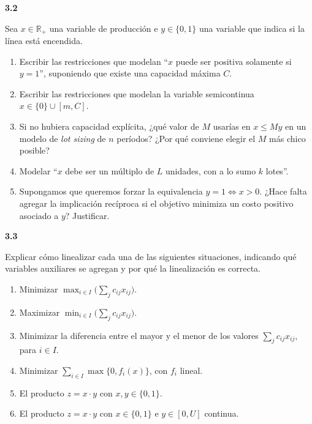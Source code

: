 \documentclass[11pt,a4paper]{article}
\newcommand{\ejercicio}[1]{\par\medskip\noindent\textbf{#1}\par\nopagebreak\smallskip}
\newcommand{\R}{\mathbb{R}}
\begin{document}
\ejercicio{3.2}
Sea $x \in \R_+$ una variable de producción e $y \in \{0,1\}$ una variable que
indica si la línea está encendida.
\begin{enumerate}
  \item Escribir las restricciones que modelan ``$x$ puede ser positiva
  solamente si $y = 1$'', suponiendo que existe una capacidad máxima $C$.
  \item Escribir las restricciones que modelan la variable semicontinua
  $x \in \{0\} \cup [m, C]$.
  \item Si no hubiera capacidad explícita, ¿qué valor de $M$ usarías en
  $x \le M y$ en un modelo de \emph{lot sizing} de $n$ períodos? ¿Por qué
  conviene elegir el $M$ más chico posible?
  \item Modelar ``$x$ debe ser un múltiplo de $L$ unidades, con a lo sumo $k$
  lotes''.
  \item Supongamos que queremos forzar la equivalencia $y = 1 \iff x > 0$.
  ¿Hace falta agregar la implicación recíproca si el objetivo minimiza un costo
  positivo asociado a $y$? Justificar.
\end{enumerate}

\ejercicio{3.3}
Explicar cómo linealizar cada una de las siguientes situaciones, indicando qué
variables auxiliares se agregan y por qué la linealización es correcta.
\begin{enumerate}
  \item Minimizar $\max_{i \in I} \big( \sum_{j} c_{ij} x_{ij} \big)$.
  \item Maximizar $\min_{i \in I} \big( \sum_{j} c_{ij} x_{ij} \big)$.
  \item Minimizar la diferencia entre el mayor y el menor de los valores
  $\sum_j c_{ij} x_{ij}$, para $i \in I$.
  \item Minimizar $\sum_{i \in I} \max\{0, f_i(x)\}$, con $f_i$ lineal.
  \item El producto $z = x \cdot y$ con $x, y \in \{0,1\}$.
  \item El producto $z = x \cdot y$ con $x \in \{0,1\}$ e $y \in [0, U]$
  continua.
\end{enumerate}
\end{document}
